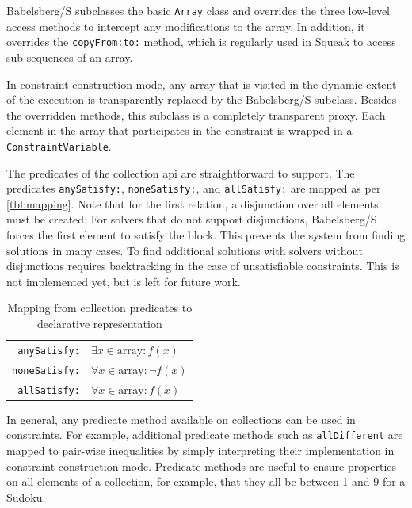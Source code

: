 Babelsberg/S subclasses the basic \lstinline!Array! class and
overrides the three low-level access methods to intercept any
modifications to the array. In addition, it overrides the
\lstinline!copyFrom:to:! method, which is regularly used in Squeak to
access sub-sequences of an array.

In constraint construction mode, any array that is visited in the
dynamic extent of the execution is transparently replaced by the
Babelsberg/S subclass. Besides the overridden methods, this subclass
is a completely transparent proxy. Each element in the array that
participates in the constraint is wrapped in a
\texttt{ConstraintVariable}.%

The predicates of the collection \ac{api} are straightforward to
support. The predicates \lstinline!anySatisfy:!,
\lstinline!noneSatisfy:!, and \lstinline!allSatisfy:! are mapped as
per \autoref{tbl:mapping}. Note that for the first relation, a
disjunction over all elements must be created. For solvers that do not
support disjunctions, Babelsberg/S forces the first element to satisfy
the block. This prevents the system from finding solutions in many
cases. To find additional solutions with solvers without disjunctions
requires backtracking in the case of unsatisfiable constraints. This
is not implemented yet, but is left for future work.

\begin{table}
  \centering
  \begin{tabular}{r|l}
    \lstinline!anySatisfy:! & $\exists x \in \text{array} : f(x)$ \\
    \lstinline!noneSatisfy:! & $\forall x \in \text{array} : \neg f(x)$ \\
    \lstinline!allSatisfy:! & $\forall x \in \text{array} : f(x)$ \\
  \end{tabular}
  \caption{Mapping from collection predicates to declarative representation}
  \label{tbl:mapping}
\end{table}

In general, any predicate method available on collections can be used
in constraints. For example, additional predicate methods such as
\lstinline!allDifferent! are mapped to pair-wise inequalities by
simply interpreting their implementation in constraint construction
mode. Predicate methods are useful to ensure properties on all
elements of a collection, for example, that they all be between 1 and
9 for a Sudoku.

